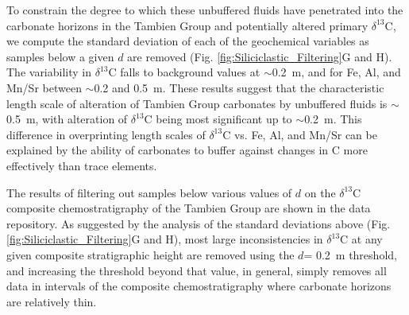 \documentclass[11pt,letterpaper]{article}
\newcommand{\dC}{$\delta^{13}$C\xspace}
\newcommand{\dsil}{$d$\xspace}
\begin{document}
To constrain the degree to which these unbuffered fluids have penetrated into the carbonate horizons in the Tambien Group and potentially altered primary \dC, we compute the standard deviation of each of the geochemical variables as samples below a given \dsil are removed (Fig. \ref{fig:Siliciclastic_Filtering}G and H). The variability in \dC falls to background values at $\sim$0.2~m, and for Fe, Al, and Mn/Sr between $\sim$0.2 and 0.5~m. These results suggest that the characteristic length scale of alteration of Tambien Group carbonates by unbuffered fluids is $\sim$0.5~m, with alteration of \dC being most significant up to $\sim$0.2~m. This difference in overprinting length scales of \dC vs. Fe, Al, and Mn/Sr can be explained by the ability of carbonates to buffer against changes in C more effectively than trace elements.

The results of filtering out samples below various values of \dsil on the \dC composite chemostratigraphy of the Tambien Group are shown in the data repository. As suggested by the analysis of the standard deviations above (Fig. \ref{fig:Siliciclastic_Filtering}G and H), most large inconsistencies in \dC at any given composite stratigraphic height are removed using the \dsil = 0.2~m threshold, and increasing the threshold beyond that value, in general, simply removes all data in intervals of the composite chemostratigraphy where carbonate horizons are relatively thin.
\end{document}

